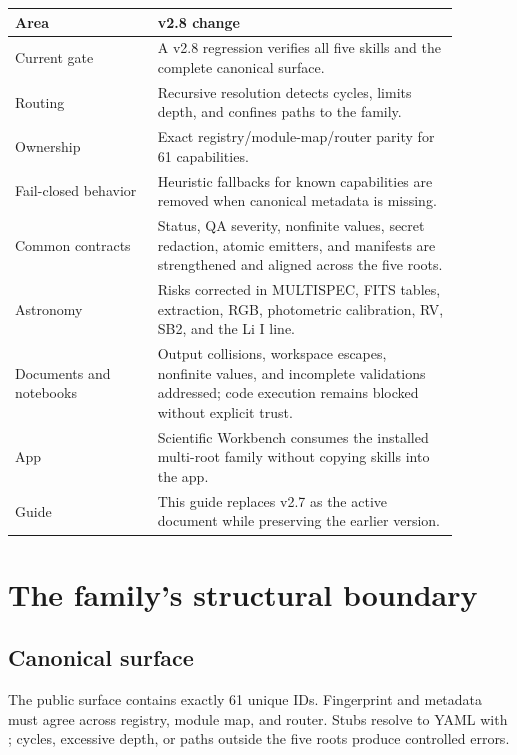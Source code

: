 \documentclass[11pt,a4paper]{article}
\newcommand{\code}[1]{\texttt{\detokenize{#1}}}
\begin{document}
\begin{longtable}{p{0.29\linewidth}p{0.59\linewidth}}
\toprule
\textbf{Area} & \textbf{v2.8 change} \\
\midrule
Current gate & A v2.8 regression verifies all five skills and the complete canonical surface. \\
Routing & Recursive resolution detects cycles, limits depth, and confines paths to the family. \\
Ownership & Exact registry/module-map/router parity for 61 capabilities. \\
Fail-closed behavior & Heuristic fallbacks for known capabilities are removed when canonical metadata is missing. \\
Common contracts & Status, QA severity, nonfinite values, secret redaction, atomic emitters, and manifests are strengthened and aligned across the five roots. \\
Astronomy & Risks corrected in MULTISPEC, FITS tables, extraction, RGB, photometric calibration, RV, SB2, and the Li I line. \\
Documents and notebooks & Output collisions, workspace escapes, nonfinite values, and incomplete validations addressed; code execution remains blocked without explicit trust. \\
App & Scientific Workbench consumes the installed multi-root family without copying skills into the app. \\
Guide & This guide replaces v2.7 as the active document while preserving the earlier version. \\
\bottomrule
\end{longtable}

\section{The family's structural boundary}
\subsection{Canonical surface}

The public surface contains exactly 61 unique IDs. Fingerprint and metadata
must agree across registry, module map, and router. Stubs resolve to YAML with
\code{entries:}; cycles, excessive depth, or paths outside the five roots produce
controlled errors.
\end{document}

